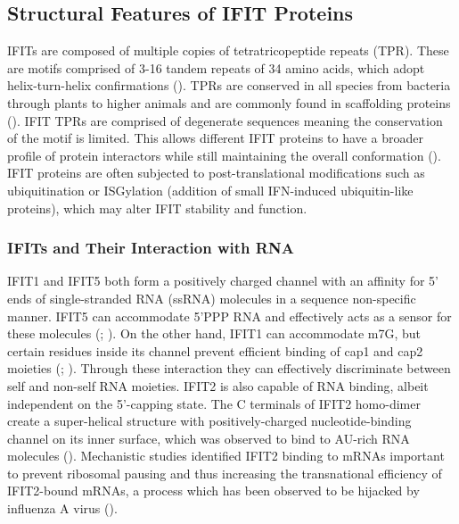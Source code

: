 \subsection{Structural Features of IFIT Proteins} \label{subsec:Structural Features of IFIT Proteins}
IFITs are composed of multiple copies of tetratricopeptide repeats (TPR). These are motifs comprised of 3-16 tandem repeats of 34 amino acids, which adopt helix-turn-helix confirmations (\cite{DAndrea2003TPRHelix}). TPRs are conserved in all species from bacteria through plants to higher animals and are commonly found in scaffolding proteins (\cite{Vladimer2014IFITs:Proteins}). IFIT TPRs are comprised of degenerate sequences meaning the conservation of the motif is limited. This allows different IFIT proteins to have a broader profile of protein interactors while still maintaining the overall conformation (\cite{Fensterl2015Interferon-InducedPathogenesis}). IFIT proteins are often subjected to post-translational modifications such as ubiquitination or ISGylation (addition of small IFN-induced ubiquitin-like proteins), which may alter IFIT stability and function.




\subsubsection{IFITs and Their Interaction with RNA} \label{IFITs and Their Interaction with RNA}
IFIT1 and IFIT5 both form a positively charged channel with an affinity for 5' ends of single-stranded RNA (ssRNA) molecules in a sequence non-specific manner. IFIT5 can accommodate 5'PPP RNA and effectively acts as a sensor for these molecules (\cite{Abbas2013StructuralProteins}; \cite{Pichlmair2011IFIT1RNA}). On the other hand, IFIT1 can accommodate m7G, but certain residues inside its channel prevent efficient binding of cap1 and cap2 moieties (\cite{Diamond2014IFIT1:Translation}; \cite{Mears2018BetterResponse}). Through these interaction they can effectively discriminate between self and non-self RNA moieties. IFIT2 is also capable of RNA binding, albeit independent on the 5'-capping state. The C terminals of IFIT2 homo-dimer create a super-helical structure with positively-charged nucleotide-binding channel on its inner surface, which was observed to bind to AU-rich RNA molecules (\cite{Yang2012CrystalMechanisms}). Mechanistic studies identified IFIT2 binding to mRNAs important to prevent ribosomal pausing and thus increasing the transnational efficiency of IFIT2-bound mRNAs, a process which has been observed to be hijacked by influenza A virus (\cite{Tran2020InfluenzaMRNAs}).


